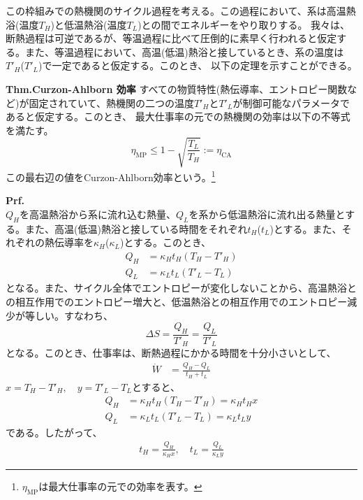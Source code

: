 \documentclass[a4paper,11pt]{jsarticle}
\numberwithin{equation}{section}
\begin{document}
この枠組みでの熱機関のサイクル過程を考える。この過程において、系は高温熱浴(温度$T_{H}$)と低温熱浴(温度$T_{L}$)との間でエネルギーをやり取りする。
我々は、断熱過程は可逆であるが、等温過程に比べて圧倒的に素早く行われると仮定する。また、等温過程において、高温(低温)熱浴と接しているとき、系の温度は$T'_H$($T'_L$)で一定であると仮定する。このとき、
以下の定理を示すことができる。

\begin{itembox}[l]{\textbf{Thm.Curzon-Ahlborn 効率}}
  すべての物質特性(熱伝導率、エントロピー関数など)が固定されていて、熱機関の二つの温度$T'_H$と$T'_L$が制御可能なパラメータであると仮定する。このとき、
  最大仕事率の元での熱機関の効率は以下の不等式を満たす。
  \begin{equation}
    \eta_{\text{MP}} \leq 1 - \sqrt{\frac{T_L}{T_H}} := \eta_{\text{CA}}
  \end{equation}
  この最右辺の値をCurzon-Ahlborn効率という。\footnote{$\eta_{\text{MP}}$は最大仕事率の元での効率を表す。}
\end{itembox}
\textbf{Prf.}\\
$Q_{H}$を高温熱浴から系に流れ込む熱量、$Q_{L}$を系から低温熱浴に流れ出る熱量とする。また、高温(低温)熱浴と接している時間をそれぞれ$t_{H}$($t_{L}$)とする。また、それぞれの熱伝導率を$\kappa_{H}$($\kappa_{L}$)とする。このとき、
\begin{align}
  Q_{H} &= \kappa_{H}t_{H}(T_{H}-T'_{H})\\
  Q_{L} &= \kappa_{L}t_{L}(T'_{L}-T_{L})
\end{align}
となる。また、サイクル全体でエントロピーが変化しないことから、高温熱浴との相互作用でのエントロピー増大と、低温熱浴との相互作用でのエントロピー減少が等しい。すなわち、
\begin{equation}
  \Delta S = \frac{Q_{H}}{T'_{H}} = \frac{Q_{L}}{T'_{L}}
\end{equation}
となる。このとき、仕事率は、断熱過程にかかる時間を十分小さいとして、
\begin{align}
  \dot{W} &= \frac{Q_{H} - Q_{L}}{t_{H} + t_{L}}
\end{align}
$x = T_{H} - T'_{H},\quad y = T'_{L} - T_{L}$とすると、
\begin{align}
  Q_{H} &= \kappa_{H}t_{H}(T_{H}-T'_{H}) = \kappa_{H}t_{H}x\\
  Q_{L} &= \kappa_{L}t_{L}(T'_{L}-T_{L}) = \kappa_{L}t_{L}y
\end{align}
である。したがって、
\begin{align}
  t_{H} = \frac{Q_{H}}{\kappa_{H}x},\quad t_{L} = \frac{Q_{L}}{\kappa_{L}y}
\end{align}
\end{document}
